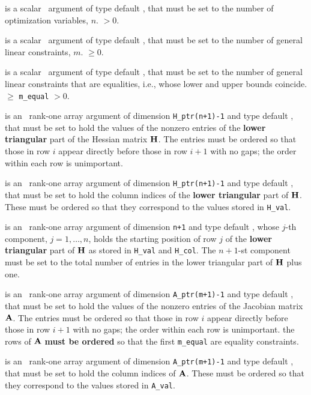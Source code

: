 \documentclass{galahad}
\begin{document}
\begin{description}
 is a scalar \intentin\ argument of type default \integer,
 that must be set  to the number of optimization variables, $n$.
 $> 0$.

 is a scalar \intentin\ argument of type default \integer,
 that must be set to the number of general linear constraints, $m$.
 $\geq 0$.

 is a scalar \intentin\ argument of type default \integer,
 that must be set to the number of general linear constraints that
 are equalities, i.e., whose lower and upper bounds coincide.
 $\geq$ {\tt m\_equal} $> 0$.

 is an \intentin\  rank-one array argument
of dimension {\tt H\_ptr(n+1)-1} and type default \realdp, that must be set
to hold the values of the nonzero entries of the {\bf lower triangular} part
of the Hessian matrix ${\mathbf{H}}$. The entries must be ordered so that those
in row $i$ appear directly before those in row $i+1$ with no gaps;
the order within each row is unimportant.

 is an \intentin\ rank-one array argument
of dimension {\tt H\_ptr(n+1)-1} and type default \integer, that must be set
to hold the column indices of the {\bf lower triangular} part of
${\mathbf{H}}$. These must be ordered so that they correspond to the values stored
in {\tt H\_val}.

 is an \intentin\ rank-one array argument
of dimension {\tt n+1} and type default \integer,
whose $j$-th component, $j = 1, \ldots , n$, holds the
starting position of row $j$ of the {\bf lower triangular} part of
${\mathbf{H}}$ as stored in {\tt H\_val} and {\tt H\_col}. The $n+1$-st
component must be set to the total number of entries in the lower
triangular part of ${\mathbf{H}}$ plus one.

 is an \intentin\  rank-one array argument
of dimension {\tt A\_ptr(m+1)-1} and type default \realdp, that must be set
to hold the values of the nonzero entries
of the Jacobian matrix ${\mathbf{A}}$. The entries must be ordered so that those
in row $i$ appear directly before those in row $i+1$ with no gaps;
the order within each row is unimportant. 
\restriction the rows of ${\mathbf{A}}$ {\bf must be ordered} 
so that the first {\tt m\_equal} are equality constraints.

 is an \intentin\ rank-one array argument
of dimension {\tt A\_ptr(m+1)-1} and type default \integer, that must be set
to hold the column indices of ${\mathbf{A}}$. These must be ordered so that they
correspond to the values stored in {\tt A\_val}.


\end{description}
\end{document}
